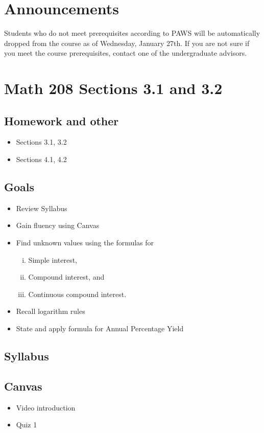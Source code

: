 \documentclass[14pt]{extarticle}
\begin{document}
	
\section*{Announcements}
Students who do not meet prerequisites according to PAWS will be automatically dropped from the course as of Wednesday, January 27th. If you are not sure if you meet the course prerequisites, contact one of the
undergraduate advisors.

\section*{Math 208 Sections 3.1 and 3.2}

\subsection{Homework and other}
\begin{itemize}
\item Sections 3.1, 3.2
\item Sections 4.1, 4.2
\end{itemize}

\subsection{Goals}

\begin{itemize}
	\item Review Syllabus
	\item Gain fluency using Canvas
	\item Find unknown values using the formulas for 
	\begin{enumerate}[(i)]
		\item Simple interest,
		\item Compound interest, and
		\item Continuous compound interest.
	\end{enumerate}
	\item Recall logarithm rules
	\item State and apply formula for Annual Percentage Yield
\end{itemize}

\subsection{Syllabus}

\subsection{Canvas}
\begin{itemize}
	\item Video introduction
	\item Quiz 1
\end{itemize}
\end{document}

